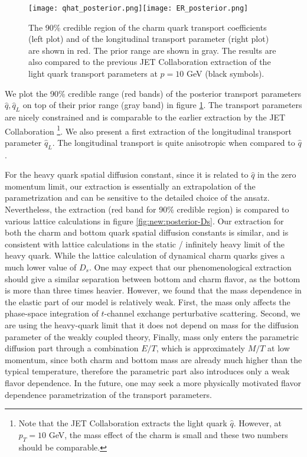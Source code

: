 \begin{figure}
\centering
\texttt{[image: qhat\_posterior.png]}\texttt{[image: ER\_posterior.png]}
\caption{The 90\% credible region of the charm quark transport coefficients (left plot) and of the longitudinal transport parameter (right plot) are shown in red. The prior range are shown in gray. The results are also compared to the previous JET Collaboration extraction of the light quark transport parameters at $p=10$ GeV (black symbols). }
\label{fig:new:posterior-qhat}
\end{figure}

We plot the 90\% credible range (red bands) of the posterior transport parameters $\hat{q}, \hat{q}_L$ on top of their prior range (gray band) in figure \ref{fig:new:posterior-qhat}.
The transport parameters are nicely constrained and is comparable to the earlier extraction by the JET Collaboration \footnote{Note that the JET Collaboration extracts the light quark $\hat{q}$. However, at $p_T = 10$ GeV, the mass effect of the charm is small and these two numbers should be comparable.}.
We also present a first extraction of the longitudinal transport parameter $\hat{q}_L$. 
The longitudinal transport is quite anisotropic when compared to $\hat{q}$.

For the heavy quark spatial diffusion constant, since it is related to $\hat{q}$ in the zero momentum limit, our extraction is essentially an extrapolation of the parametrization and can be sensitive to the detailed choice of the ansatz.
Nevertheless, the extraction (red band for 90\% credible region) is compared to various lattice calculations \cite{Banerjee:2011ra,Ding:2012sp,Francis:2015daa} in  figure \ref{fig:new:posterior-Ds}.
Our extraction for both the charm and bottom quark spatial diffusion constants is similar, and is consistent with lattice calculations in the static / infinitely heavy limit of the heavy quark.
While the lattice calculation of dynamical charm quarks gives a much lower value of $D_s$.
One may expect that our phenomenological extraction should give a similar separation between bottom and charm flavor, as the bottom is more than three times heavier.
However, we found that the mass dependence in the elastic part of our model is relatively weak. 
First, the mass only affects the phase-space integration of $t$-channel exchange perturbative scattering.
Second, we are using the heavy-quark limit that it does not depend on mass for the diffusion parameter of the weakly coupled theory, 
Finally, mass only enters the parametric diffusion part through a combination $E/T$, which is approximately $M/T$ at low momentum, since both charm and bottom mass are already much higher than the typical temperature, therefore the parametric part also introduces only a weak flavor dependence.
In the future, one may seek a more physically motivated flavor dependence parametrization of the transport parameters.

